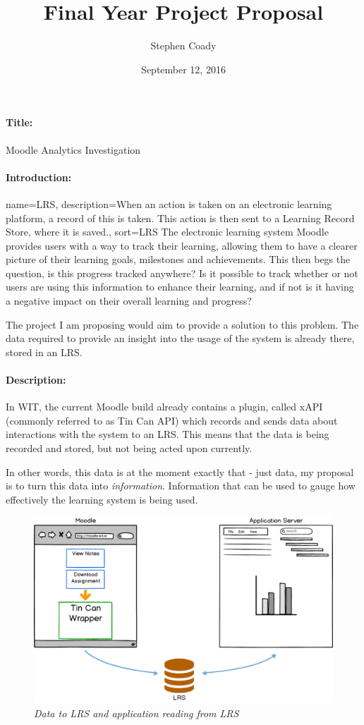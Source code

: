 \documentclass{article}
\author{Stephen Coady}
\title{Final Year Project Proposal}
\date{September 12, 2016}
\begin{document}


\newpage

\paragraph{Title:}
\label{par:Title}
Moodle Analytics Investigation

\paragraph{Introduction:}
{
  name={LRS},
  description={When an action is taken on an electronic learning platform, a record of this is taken. This action is then sent to a Learning Record Store, where it is saved.},
  sort=LRS
}
\label{par:Introduction}
The electronic learning system Moodle provides users with a way to track their learning, allowing them to have a clearer picture of their learning goals, milestones and achievements. This then begs the question, is this progress tracked anywhere? Is it possible to track whether or not users are using this information to enhance their learning, and if not is it having a negative impact on their overall learning and progress?

The project I am proposing would aim to provide a solution to this problem. The data required to provide an insight into the usage of the system is already there, stored in an \gls{LRS}.

\paragraph{Description:}
\label{par:Description}
In WIT, the current Moodle build already contains a plugin, called xAPI (commonly referred to as Tin Can API) which records and sends data about interactions with the system to an LRS. This means that the data is being recorded and stored, but not being acted upon currently. 

In other words, this data is at the moment exactly that - just data, my proposal is to turn this data into \textit{information}. Information that can be used to gauge how effectively the learning system is being used.
\begin{figure}[!hb]
\centering
\includegraphics*[width=1\textwidth]{components/images/overview}
\caption{\em Data to LRS and application reading from LRS}
\label{fig:overview}
\end{figure}
\end{document}
